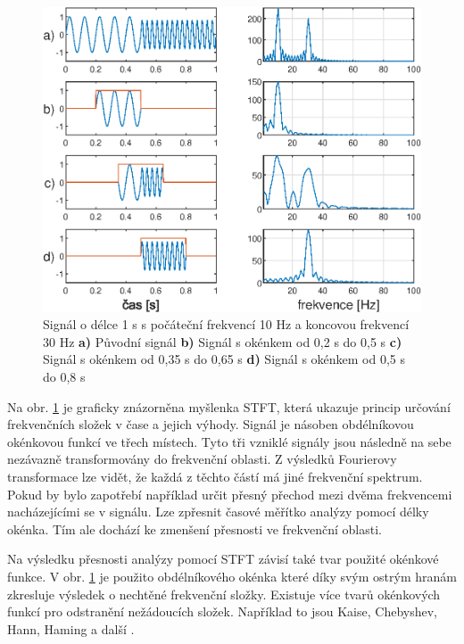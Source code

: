   \begin{figure}[H]
    \centering
    \includegraphics[width = 1\linewidth]{obrazky/STFT.eps}
    \caption{Signál o délce 1 s s počáteční frekvencí 10 Hz a koncovou frekvencí 30 Hz \textbf{a)} Původní signál \textbf{b)} Signál s okénkem od 0,2 s do 0,5 s \textbf{c)} Signál s okénkem od 0,35 s do 0,65 s \textbf{d)} Signál s okénkem od 0,5 s do 0,8 s \cite{fundamental_of_music_processing}}
    \label{fig:STFT}
  \end{figure}

  Na obr. \ref{fig:STFT} je graficky znázorněna myšlenka \acs{STFT}, která ukazuje princip určování frekvenčních složek v čase a jejich výhody. 
  Signál je násoben obdélníkovou okénkovou funkcí ve třech místech.
  Tyto tři vzniklé signály jsou následně na sebe nezávazně transformovány do frekvenční oblasti.
  Z výsledků Fourierovy transformace lze vidět, že každá z těchto částí má jiné frekvenční spektrum.
  Pokud by bylo zapotřebí například určit přesný přechod mezi dvěma frekvencemi nacházejícími se v signálu. Lze zpřesnit časové měřítko analýzy pomocí délky okénka.
  Tím ale dochází ke zmenšení přesnosti ve frekvenční oblasti.
  
  Na výsledku přesnosti analýzy pomocí \acs{STFT} závisí také tvar použité okénkové funkce.
  V obr. \ref{fig:STFT} je použito obdélníkového okénka které díky svým ostrým hranám zkresluje výsledek o nechtěné frekvenční složky.
  Existuje více tvarů okénkových funkcí pro odstranění nežádoucích složek.
  Například to jsou Kaise, Chebyshev, Hann, Haming a další \cite{Time-frequency_distributions}.
  
